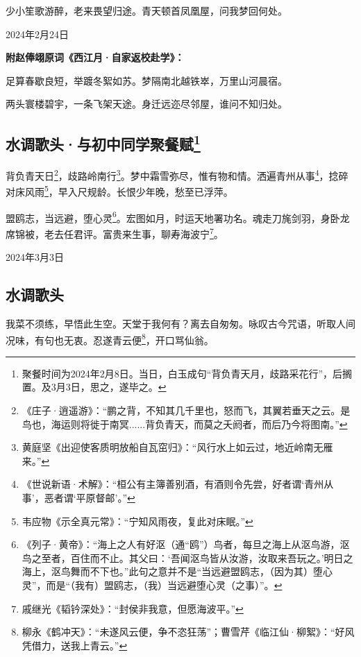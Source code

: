 \documentclass[a5paper]{ctexart}
\begin{document}
	少小笙歌游醉，老来畏望归途。青天顿首凤凰屋，问我梦回何处。
	\begin{flushright}
		2024年2月24日
	\end{flushright}
	
	\begin{flushleft}
		\textbf{附赵俸翊原词《西江月·自家返校赴学》：}
	\end{flushleft}
	
	 足算春歇良短，举踱冬絮如苏。梦隔南北越铁崒，万里山河晨宿。
	 
	两头寰楼碧宇，一条飞架天途。身迁远迩尽邻屋，谁问不知归处。
	
	\subsection[水调歌头·与初中同学聚餐赋]{水调歌头·与初中同学聚餐赋\footnote{聚餐时间为2024年2月8日。当日，白玉成句“背负青天月，歧路采花行”，后搁置。及3月3日，思之，遂毕之。}}
	背负青天日\footnote{《庄子·逍遥游》：“鹏之背，不知其几千里也，怒而飞，其翼若垂天之云。是鸟也，海运则将徙于南冥......背负青天，而莫之夭阏者，而后乃今将图南。”}，歧路岭南行\footnote{黄庭坚《出迎使客质明放船自瓦窋归》：“风行水上如云过，地近岭南无雁来。”}。梦中霜雪弥尽，惟有物和情。洒遍青州从事\footnote{《世说新语·术解》：“桓公有主簿善别酒，有酒则令先尝，好者谓‘青州从事’，恶者谓‘平原督邮’。”}，捻碎对床风雨\footnote{韦应物《示全真元常》：“宁知风雨夜，复此对床眠。”}，早入尺规龄。长恨少年晚，愁至已浮萍。
	
	盟鸥志，当远避，堕心灵\footnote{《列子·黄帝》：“海上之人有好沤（通“鸥”）鸟者，每旦之海上从沤鸟游，沤鸟之至者，百住而不止。其父曰：‘吾闻沤鸟皆从汝游，汝取来吾玩之。’明日之海上，沤鸟舞而不下也。”此句之意并不是“当远避盟鸥志，（因为其）堕心灵”，而是“（我有）盟鸥志，（我）当远避堕心灵（之事）”。}。宏图如月，时运天地署功名。魂走刀旄剑羽，身卧龙席锦被，老去任君评。富贵来生事，聊寿海波宁\footnote{戚继光《韬钤深处》：“封侯非我意，但愿海波平。”}。
	\begin{flushright}
		2024年3月3日
	\end{flushright}
	
	\subsection[水调歌头（我菜不须练）]{水调歌头}
	我菜不须练，早悟此生空。天堂于我何有？离去自匆匆。咏叹古今咒语，听取人间况味，有句也无衷。忍遂青云便\footnote{柳永《鹤冲天》：“未遂风云便，争不恣狂荡”；曹雪芹《临江仙·柳絮》：“好风凭借力，送我上青云。”}，开口骂仙翁。
	
\end{document}

